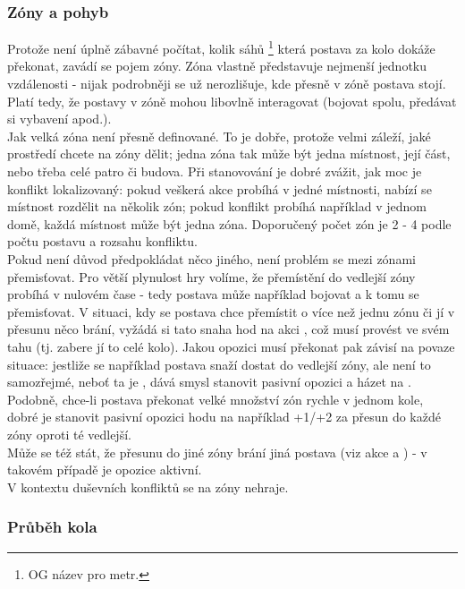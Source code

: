 \subsubsection{Zóny a pohyb}
\label{sec:zónyapohyb}

Protože není úplně zábavné počítat, kolik sáhů \footnote{OG název pro metr.} která postava za kolo dokáže překonat, zavádí se pojem zóny. Zóna vlastně představuje nejmenší jednotku vzdálenosti - nijak podrobněji se už nerozlišuje, kde přesně v zóně postava stojí. Platí tedy, že postavy v zóně mohou libovlně interagovat (bojovat spolu, předávat si vybavení apod.).\\
Jak velká zóna není přesně definované. To je dobře, protože velmi záleží, jaké prostředí chcete na zóny dělit; jedna zóna tak může být jedna místnost, její část, nebo třeba celé patro či budova. Při stanovování je dobré zvážit, jak moc je konflikt lokalizovaný: pokud veškerá akce probíhá v jedné místnosti, nabízí se místnost rozdělit na několik zón; pokud konflikt probíhá například v jednom domě, každá místnost může být jedna zóna. Doporučený počet zón je 2 - 4 podle počtu postavu a rozsahu konfliktu.\\
Pokud není důvod předpokládat něco jiného, není problém se mezi zónami přemisťovat. Pro větší plynulost hry volíme, že přemístění do vedlejší zóny probíhá v nulovém čase - tedy postava může například bojovat a k tomu se přemisťovat. V situaci, kdy se postava chce přemístit o více než jednu zónu či jí v přesunu něco brání, vyžádá si tato snaha hod na akci , což musí provést ve svém tahu (tj. zabere jí to celé kolo). Jakou opozici musí překonat pak závisí na povaze situace: jestliže se například postava snaží dostat do vedlejší zóny, ale není to samozřejmé, neboť ta je , dává smysl stanovit pasivní opozici a házet na . Podobně, chce-li postava překonat velké množství zón rychle v jednom kole, dobré je stanovit pasivní opozici hodu na například +1/+2 za přesun do každé zóny oproti té vedlejší.\\
Může se též stát, že přesunu do jiné zóny brání jiná postava (viz akce  a ) - v takovém případě je opozice aktivní.\\
V kontextu duševních konfliktů se na zóny nehraje.


\subsubsection{Průběh kola}
\label{sec:prubehkola}

